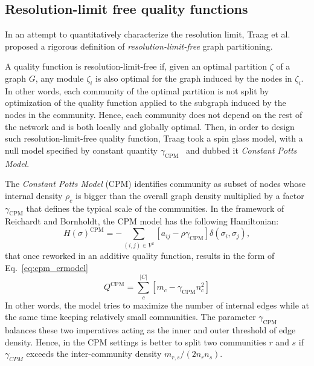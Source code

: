 \subsection{Resolution-limit free quality functions}\label{sec:resolution_limit_free_quality_functions}
In an attempt to quantitatively characterize the resolution limit, Traag et al.~\cite{traag2011} proposed a rigorous definition of \emph{resolution-limit-free} graph partitioning.

A quality function is resolution-limit-free if, given an optimal partition $\zeta$ of a graph $G$, any module $\zeta_i$ is also optimal for the graph induced by the nodes in $\zeta_i$.
In other words, each community of the optimal partition is not split by optimization of the quality function applied to the subgraph induced by the nodes in the community.
Hence, each community does not depend on the rest of the network and is both locally and globally optimal.
Then, in order to design such resolution-limit-free quality function, Traag took a spin glass model, with a null model specified by constant quantity $\gamma_{\textrm{CPM}}$~\cite{traag2011} and dubbed it \emph{Constant Potts Model}.

The \emph{Constant Potts Model} (CPM) identifies community as subset of nodes whose internal density $\rho_c$ is bigger than the overall graph density multiplied by a factor $\gamma_{\textrm{CPM}}$ that defines the typical scale of the communities. In the framework of Reichardt and Bornholdt, the CPM model has the following Hamiltonian: 
\begin{equation}\label{eq:cpm_hamiltonian}
H(\sigma)^{\textrm{CPM}} = - \sum \limits_{(i,j) \in V^2} \left[ a_{ij} - \rho \gamma_{\textrm{CPM}} \right] \delta(\sigma_i,\sigma_j),
\end{equation}
that once reworked in an additive quality function, results in the form of Eq.~\ref{eq:cpm_ermodel}
\begin{equation}\label{eq:cpm_ermodel}
Q^{\textrm{CPM}} = \sum \limits_c^{|C|} \left[m_c - \gamma_{\textrm{CPM}} n_c^2 \right] 
\end{equation}
In other words, the model tries to maximize the number of internal edges while at the same time keeping relatively small communities. The parameter $\gamma_{\textrm{CPM}}$ balances these two imperatives acting as the inner and outer threshold of edge density.
Hence, in the CPM settings is better to split two communities $r$ and $s$ if $\gamma_{CPM}$ exceeds the inter-community density $m_{r,s}/(2n_r n_s)$.

